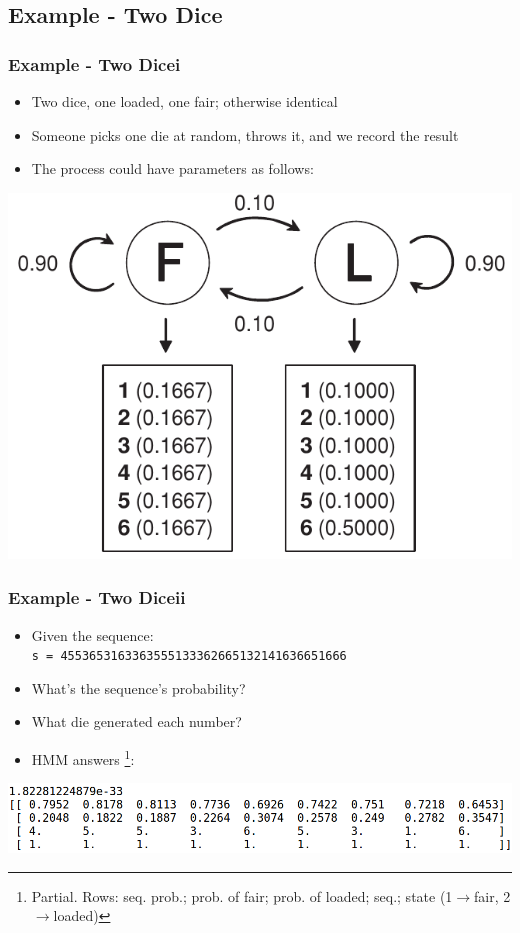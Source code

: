 \documentclass[11pt]{beamer}
\begin{document}
    \subsection{Example - Two Dice}
    \begin{frame}
        \frametitle{Example - Two Dice\quad i}
        \begin{itemize}
            \item Two dice, one loaded, one fair; otherwise identical
            \item Someone picks one die at random, throws it, and we record the result
            \item The process could have parameters as follows:
        \end{itemize}
        \centering
        \includegraphics[height=0.6\textheight]{images/two_dice_params.png}
    \end{frame}
    
    \begin{frame}
        \frametitle{Example - Two Dice\quad ii}
        \begin{itemize}
            \item Given the sequence:\\
            \texttt{s = 4553653163363555133362665132141636651666}
            \item What's the sequence's probability?
            \item What die generated each number?
            \item HMM answers \footnote{Partial. Rows: seq. prob.; prob. of fair; prob. of loaded; seq.; state (1$\rightarrow$fair, 2$\rightarrow$loaded)}:
        \end{itemize}
        \centering
        \includegraphics[scale=0.3]{images/two_dice_results.png}
    \end{frame}
    
\end{document}
